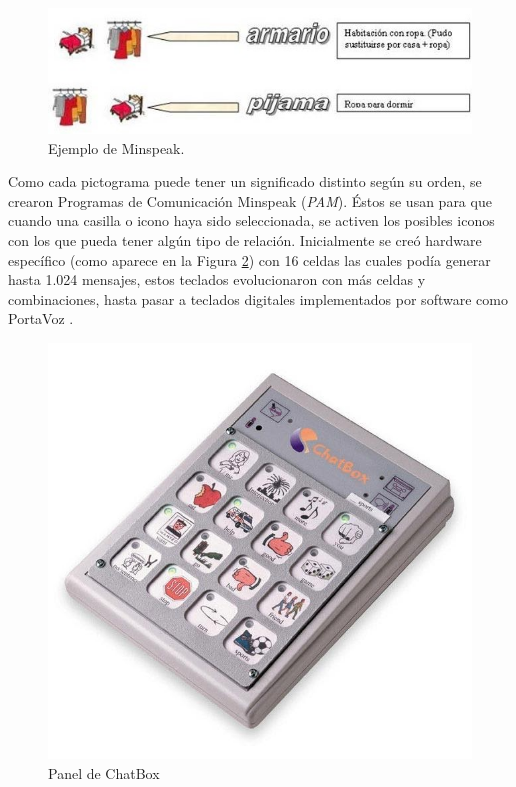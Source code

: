 \begin{figure}[h!]
	\centering
	\includegraphics[width=0.9\linewidth]{Imagenes/Bitmap/Minspeak}
	\caption{Ejemplo de Minspeak.}
	\label{fig:minspeak}
\end{figure}

Como cada pictograma puede tener un significado distinto según su orden, se crearon Programas de Comunicación Minspeak (\textit{PAM}). Éstos se usan para que cuando una casilla o icono haya sido seleccionada, se activen los posibles iconos con los que pueda tener algún tipo de relación. Inicialmente se creó hardware específico (como aparece en la Figura \ref{fig:chatbox}) con 16 celdas las cuales podía generar hasta 1.024 mensajes, estos teclados evolucionaron con más celdas y combinaciones, hasta pasar a teclados digitales implementados por software como PortaVoz \citep{minspeak}.

\begin{figure}[h!]
	\centering
	\includegraphics[width=0.6\linewidth]{Imagenes/Bitmap/ChatBox}
	\caption[ChatBox]{Panel de ChatBox}
	\label{fig:chatbox}
\end{figure}



